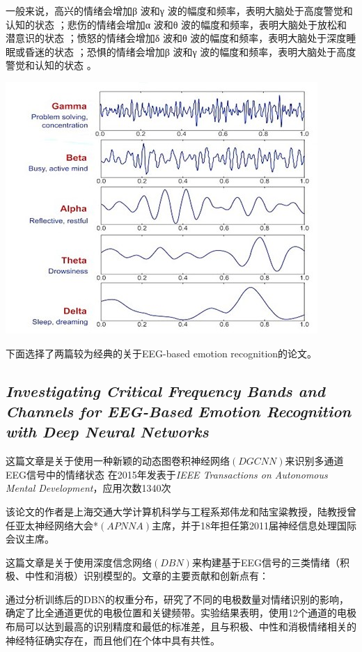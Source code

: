 \documentclass[conference]{IEEEtran}
\begin{document}
一般来说，高兴的情绪会增加β 波和γ 波的幅度和频率，表明大脑处于高度警觉和认知的状态 ；悲伤的情绪会增加α 波和θ 波的幅度和频率，表明大脑处于放松和潜意识的状态 ；愤怒的情绪会增加δ 波和θ 波的幅度和频率，表明大脑处于深度睡眠或昏迷的状态 ；恐惧的情绪会增加β 波和γ 波的幅度和频率，表明大脑处于高度警觉和认知的状态 。

\includegraphics*[scale=0.7]{images/signals.jpg}

下面选择了两篇较为经典的关于EEG-based emotion recognition的论文。
\subsection{\textit{\textbf{{Investigating Critical Frequency Bands and Channels for EEG-Based Emotion Recognition with Deep Neural Networks
}}}}
这篇文章\cite{zheng2015investigating}是关于使用一种新颖的动态图卷积神经网络$(DGCNN)$来识别多通道EEG信号中的情绪状态 在2015年发表于\textit{IEEE Transactions on Autonomous Mental Development}，应用次数1340次

该论文的作者是上海交通大学计算机科学与工程系郑伟龙和陆宝粱教授，陆教授曾任亚太神经网络大会*$(APNNA)$主席，并于18年担任第2011届神经信息处理国际会议主席。

这篇文章是关于使用深度信念网络$(DBN)$来构建基于EEG信号的三类情绪（积极、中性和消极）识别模型的。文章的主要贡献和创新点有：

通过分析训练后的DBN的权重分布，研究了不同的电极数量对情绪识别的影响，确定了比全通道更优的电极位置和关键频带。实验结果表明，使用12个通道的电极布局可以达到最高的识别精度和最低的标准差，且与积极、中性和消极情绪相关的神经特征确实存在，而且他们在个体中具有共性。
\end{document}
